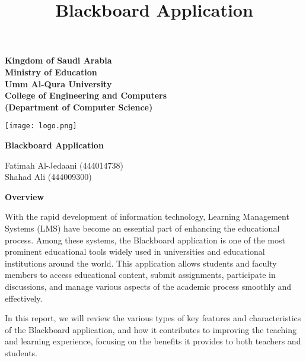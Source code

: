 \documentclass[a4paper,12pt]{article}
\title{Blackboard Application}
\date{}
\begin{document}
\noindent
\begin{minipage}{0.7\textwidth}
    \raggedright
    \textbf{Kingdom of Saudi Arabia}\\
    \textbf{Ministry of Education}\\
    \textbf{Umm Al-Qura University}\\
    \textbf{College of Engineering and Computers}\\
 \textbf{   (Department of Computer Science)\\}
\end{minipage}%
\begin{minipage}{0.3\textwidth}
    \raggedleft
    \texttt{[image: logo.png]} %
\end{minipage}

\vspace{5cm}

\begin{center}
    \LARGE \textbf{Blackboard Application}
\end{center}


\begin{center}
Fatimah Al-Jedaani (444014738)\\
Shahad Ali (444009300)\\
\textbf{\the\year}
\end{center}

\newpage

\begin{center}
    \LARGE \textbf{Overview}
\end{center}
With the rapid development of information technology, Learning
Management Systems (LMS) have become an essential part of
enhancing the educational process. Among these systems, the
Blackboard application is one of the most prominent educational tools
widely used in universities and educational institutions around the
world. This application allows students and faculty members to
access educational content, submit assignments, participate in
discussions, and manage various aspects of the academic process
smoothly and effectively.\newline

 In this report, we will review the various types of key features
and characteristics of the Blackboard application, and how it
contributes to improving the teaching and learning experience,
focusing on the benefits it provides to both teachers and students. 


\newpage
\end{document}
